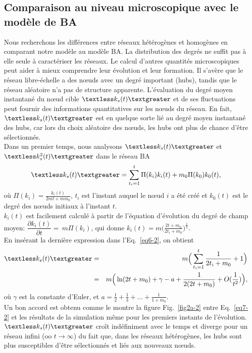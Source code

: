 \subsection{Comparaison au niveau microscopique avec le modèle de BA}
 Nous recherchons les différences entre réseaux hétérogènes et homogènes en comparant notre modèle au modèle BA. La distribution des degrés ne suffit pas à elle seule à caractériser les réseaux. Le calcul d'autres quantités microscopiques peut aider à mieux comprendre leur évolution et leur formation. Il s'avère que le réseau libre-échelle a des nœuds avec un degré important (hubs), tandis que le réseau aléatoire n'a pas de structure apparente. L'évaluation du degré moyen instantané du nœud cible $\kms$ et de ses fluctuations peut fournir des informations quantitatives sur les nœuds du réseau. En fait, $\kms$ est en quelque sorte lié au degré moyen instantané des hubs, car lors du choix aléatoire des nœuds, les hubs ont plus de chance d'être sélectionnés. \\  
 Dans un premier temps, nous analysons $\kms$ et $\kmss$ dans le réseau BA
 \begin{eqnarray}
 \kms=\sum_{t_i=1}^t\Pi(k_i)k_i(t)+m_0\Pi(k_0)k_0(t),
 \label{eq6-2}
 \end{eqnarray}
 où  $\Pi(k_i)=\frac{k_i(t)}{2mt+mm_0}$, $t_i$ est l'instant auquel le nœud $ i $ a été créé et $ k_0 (t) $ est le degré des nœuds initiaux à l'instant $t$.\\
 $k_i (t)$ est facilement calculé à partir de l'équation d'évolution du degré de champ moyen:
 $\dfrac{\partial k_i(t)}{\partial t}=~ m\Pi(k_i)$, qui donne $k_i(t)=m\Big(\frac{2t+m_0}{2t_i+m_0}\Big)^{\frac{1}{2}}$.\\
 En insérant la dernière expression dans l'Eq.~\ref{eq6-2}, on obtient
 \begin{eqnarray}
 \kms&=&m\Big(\sum_{t_i=1}^{t}\dfrac{1}{2t_i+m_0}+1\Big) \\
 &=&m \Big(\ln (2t+m_0)+\gamma-a+\frac{1}{2(2t+m_0)}+O(\frac{1}{t^2})\Big),
 \label{eq7-2}
 \end{eqnarray}
 où $\gamma$ est la constante d'Euler, et $a=\frac{1}{2}+\frac{1}{3}+\ldots+\frac{1}{1+m_0}$.\\
 Un bon accord est obtenu comme le montre la figure Fig.~\ref{fig2a-2} entre Eq.~\ref{eq7-2} et les résultats de la simulation même pour les premiers instants de l'évolution. $\kms$ croît indéfiniment avec le temps et diverge pour un réseau infini (oo $t\to\infty$) du fait que, dans les réseaux hétérogènes, les hubs sont plus susceptibles d'être sélectionnés et liés aux nouveaux nœuds. \\
